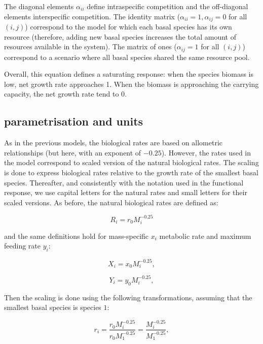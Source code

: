 \documentclass[12pt,a4paper]{article}
\begin{document}
The diagonal elements $\alpha_{ii}$ define intraspecific competition and the off-diagonal elements interspecific competition. The identity matrix ($\alpha_{ii} = 1, \alpha_{ij} = 0$ for all $(i,j)$) correspond to the model for which each basal species has its own resource (therefore, adding new basal species increases the total amount of resources available in the system). The matrix of ones ($\alpha_{ij} = 1$ for all $(i,j)$) correspond to a scenario where all basal species shared the same resource pool. 

Overall, this equation defines a saturating response: when the species biomass is low, net growth rate approaches 1. When the biomass is approaching the carrying capacity, the net growth rate tend to 0.

\subsection{parametrisation and units}
\label{subsection:Delmas_param_section}

As in the previous models, the biological rates are based on allometric relationships (but here, with an exponent of $-0.25$). However, the rates used in the model correspond to scaled version of the natural biological rates. The scaling is done to express biological rates relative to the growth rate of the smallest basal species. Thereafter, and consistently with the notation used in the functional response, we use capital letters for the natural rates and small letters for their scaled versions. As before, the natural biological rates are defined as:


\begin{equation}
R_{i} = r_0M_i^{-0.25}
\end{equation}

and the same definitions hold for mass-specific $x_i$ metabolic rate and maximum feeding rate $y_i$:

\begin{equation}
X_i = x_0M_i^{-0.25},
\end{equation}

\begin{equation}
Y_i = y_0M_i^{-0.25},
\end{equation}

Then the scaling is done using the following transformations, assuming that the smallest basal species is species $1$: 

\begin{equation}
r_{i} = \frac{r_0M_i^{-0.25}}{r_0M_1^{-0.25}} = \frac{M_i^{-0.25}}{M_1^{-0.25}},
\end{equation}
\end{document}
